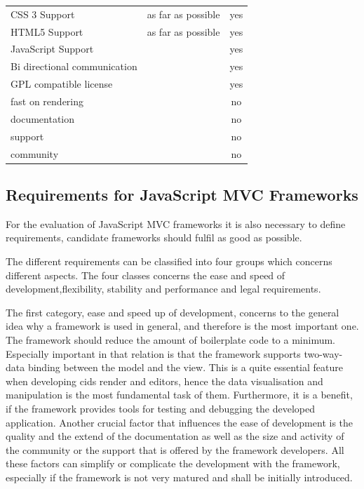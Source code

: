 \begin{minipage}{\linewidth}
\centering
 \label{tab:req_browser_comp}
\begin{tabulary}{\textwidth}{|l|C|c|}
 \hline 
{}
   &  &  \tabularnewline
 \hline
CSS 3 Support & as far as possible & yes \\
HTML5 Support & as far as possible & yes  \\
JavaScript Support & & yes \\
 Bi directional communication & & yes \\
GPL compatible license & & yes \\ \hline
fast on rendering & & no\\
documentation & & no\\
support & & no \\
community & &no \\
 \hline 
 \end{tabulary}
 \end{minipage}

\subsection{Requirements for JavaScript MVC Frameworks}

For the evaluation of JavaScript MVC frameworks it is also necessary to define requirements, candidate frameworks should fulfil as good as possible.

The different requirements can be classified into four groups which concerns different aspects.
The four classes concerns the ease and speed of development,flexibility, stability and performance and legal requirements.

The first category, ease and speed up of development, concerns to the general idea why a framework is used in general, and therefore is the most important one.
The framework should reduce the amount of boilerplate code to a minimum.
Especially important in that relation is that the framework supports two-way-data binding between the model and the view.
This is a quite essential feature when developing cids render and editors, hence the data visualisation and manipulation is the most fundamental task of them.
Furthermore, it is a benefit, if the framework provides tools for testing and debugging the developed application.
Another crucial factor that influences the ease of development is the quality and the  extend of the documentation as well as the size and activity of the community or the support that is offered by the framework developers.
All these factors can simplify or complicate the development with the framework, especially if the framework is not very matured and shall be initially introduced.


